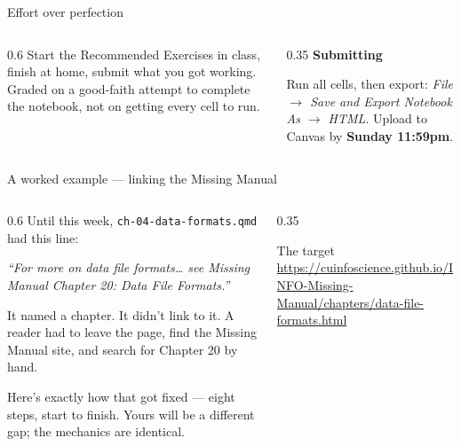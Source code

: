 \documentclass[9pt,aspectratio=169]{beamer}
\begin{document}
\begin{frame}{Effort over perfection}
    \begin{columns}[T]
        \begin{column}{0.6\textwidth}
            Start the Recommended Exercises in class, finish at home, submit what you got working. Graded on a good-faith attempt to complete the notebook, not on getting every cell to run.
        \end{column}
        \begin{column}{0.35\textwidth}
            \textbf{Submitting}\\[2pt]
            {\footnotesize Run all cells, then export: \textit{File $\rightarrow$ Save and Export Notebook As $\rightarrow$ HTML}. Upload to Canvas by \textbf{Sunday 11:59pm}.\par}
        \end{column}
    \end{columns}
\end{frame}


\begin{frame}{A worked example --- linking the Missing Manual}
    \begin{columns}[T]
        \begin{column}{0.6\textwidth}
            Until this week, \texttt{ch-04-data-formats.qmd} had this line:

            \medskip
            \textit{``For more on data file formats\ldots{} see Missing Manual Chapter 20: Data File Formats.''}

            \medskip
            It named a chapter. It didn't link to it. A reader had to leave the page, find the Missing Manual site, and search for Chapter 20 by hand.

            \medskip
            Here's exactly how that got fixed --- eight steps, start to finish. Yours will be a different gap; the mechanics are identical.
        \end{column}
        \begin{column}{0.35\textwidth}
            \begin{alertblock}{The target}
                \footnotesize \url{https://cuinfoscience.github.io/INFO-Missing-Manual/chapters/data-file-formats.html}
            \end{alertblock}
        \end{column}
    \end{columns}
\end{frame}
\end{document}
